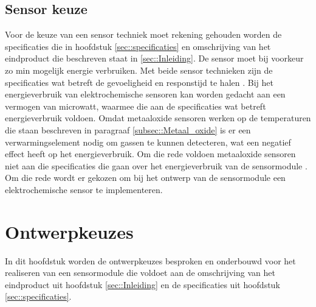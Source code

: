 \documentclass[a4paper, 11pt]{article} %
\begin{document}
	\subsection{Sensor keuze} \label{subsec::Sensor_keuze}
	Voor de keuze van een sensor techniek moet rekening gehouden worden de specificaties die in hoofdstuk \ref{sec::specificaties} en omschrijving van het eindproduct die beschreven staat in \ref{sec::Inleiding}. De sensor moet bij voorkeur zo min mogelijk energie verbruiken. Met beide sensor technieken zijn de specificaties wat betreft de gevoeligheid en responstijd te halen \cite{Sensor keuze}. Bij het energieverbruik van elektrochemische sensoren kan worden gedacht aan een vermogen van microwatt, waarmee die aan de specificaties wat betreft energieverbruik voldoen. Omdat metaaloxide sensoren werken op de temperaturen die staan beschreven in paragraaf \ref{subsec::Metaal_oxide} is er een verwarmingselement nodig om gassen te kunnen detecteren, wat een negatief effect heeft op het energieverbruik. Om die rede voldoen metaaloxide sensoren niet aan die specificaties die gaan over het energieverbruik van de sensormodule \cite{MO sensoren} \cite{Sensor keuze}.\\
	Om die rede wordt er gekozen om bij het ontwerp van de sensormodule een elektrochemische sensor te implementeren.
	
	\section{Ontwerpkeuzes} \label{sec::Ontwerpkeuzes}
	In dit hoofdstuk worden de ontwerpkeuzes besproken en onderbouwd voor het realiseren van een sensormodule die voldoet aan de omschrijving van het eindproduct uit hoofdstuk \ref{sec::Inleiding} en de specificaties uit hoofdstuk \ref{sec::specificaties}.
	
\end{document}
